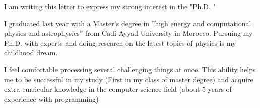 \begin{cvletter}
I am writing this letter to express my strong interest in the "Ph.D. \thesis"


I graduated last year with a Master’s degree in ”high energy and computational physics and astrophysics” from Cadi Ayyad University in Morocco. Pursuing my Ph.D. with experts and doing research on the latest topics of physics is my childhood dream.

% 
I feel comfortable processing several challenging things at once. This ability helps me to be successful in my study (First in my class of master degree) and acquire extra-curricular knowledge in the computer science field (about 5 years of experience with programming)


\end{cvletter}
